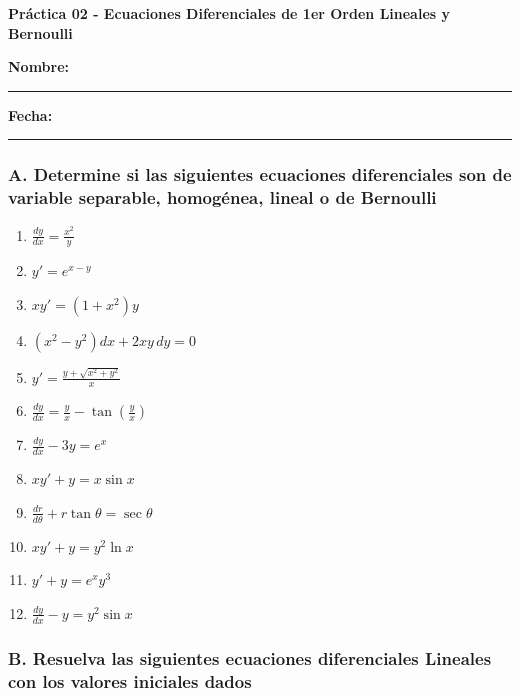\documentclass[a4paper,12pt]{article}
\begin{document}
\begin{center}
    \Large\textbf{Práctica 02 - Ecuaciones Diferenciales de 1er Orden Lineales y Bernoulli}\\[0.5cm]  

\end{center}
  \textbf{Nombre:} \rule{9cm}{0.4pt}  \textbf{Fecha:} \rule{4.5cm}{0.4pt}


\subsubsection*{A. Determine si las siguientes ecuaciones diferenciales son de variable separable, homogénea, lineal o de Bernoulli}

\begin{enumerate}
    \item \( \frac{dy}{dx} = \frac{x^2}{y} \)
    \item \( y' = e^{x-y} \)
    \item \( x y' = (1+x^2)y \)
    \item \( (x^2 - y^2)dx + 2xy\,dy = 0 \)
    \item \( y' = \frac{y+\sqrt{x^2+y^2}}{x} \)
    \item \( \frac{dy}{dx} = \frac{y}{x} - \tan\left(\frac{y}{x}\right) \)
    \item \( \frac{dy}{dx} - 3y = e^x \)
    \item \( x y' + y = x \sin x \)
    \item \( \frac{dr}{d\theta} + r \tan \theta = \sec \theta \)
    \item \( x y' + y = y^2 \ln x \)
    \item \( y' + y = e^x y^3 \)
    \item \( \frac{dy}{dx} - y = y^2 \sin x \)
\end{enumerate}

\subsubsection*{B. Resuelva las siguientes ecuaciones diferenciales Lineales con los valores iniciales dados}
\end{document}
